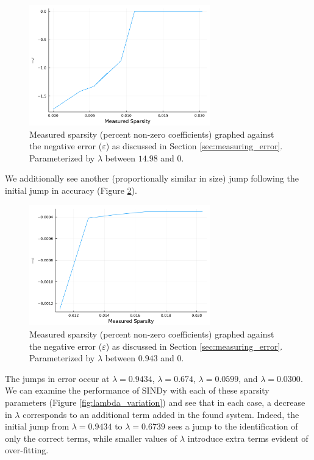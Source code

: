 \documentclass[10pt]{paper}
\begin{document}
\begin{figure}[H]
	\caption{Measured sparsity (percent non-zero coefficients) graphed against the negative error ($\varepsilon$) as discussed in Section \ref{sec:measuring_error}. Parameterized by $\lambda$ between $14.98$ and $0$.}
	\label{fig:large_scale_sparsity_error}
	\centering 

	\includegraphics[width = 0.7\textwidth]{large_scale_error_sparsity.pdf}
\end{figure}
We additionally see another (proportionally similar in size) jump following the initial jump in accuracy (Figure \ref{fig:small_scale_sparsity_error}).
\begin{figure}[h]
	\caption{Measured sparsity (percent non-zero coefficients) graphed against the negative error ($\varepsilon$) as discussed in Section \ref{sec:measuring_error}. Parameterized by $\lambda$ between $0.943$ and $0$.}
	\label{fig:small_scale_sparsity_error}
	\centering 

	\includegraphics[width=0.7\textwidth]{small_scale_error_sparsity.pdf}

\end{figure}
The jumps in error occur at $\lambda = 0.9434$, $\lambda = 0.674$, $\lambda = 0.0599$, and $\lambda = 0.0300$. We can examine the performance of SINDy with each of these sparsity parameters (Figure \ref{fig:lambda_variation}) and see that in each case, a decrease in $\lambda$ corresponds to an additional term added in the found system. 
Indeed, the initial jump from $\lambda = 0.9434$ to $\lambda = 0.6739$ sees a jump to the identification of only the correct terms, while smaller values of $\lambda$ introduce extra terms evident of over-fitting. 
\end{document}
